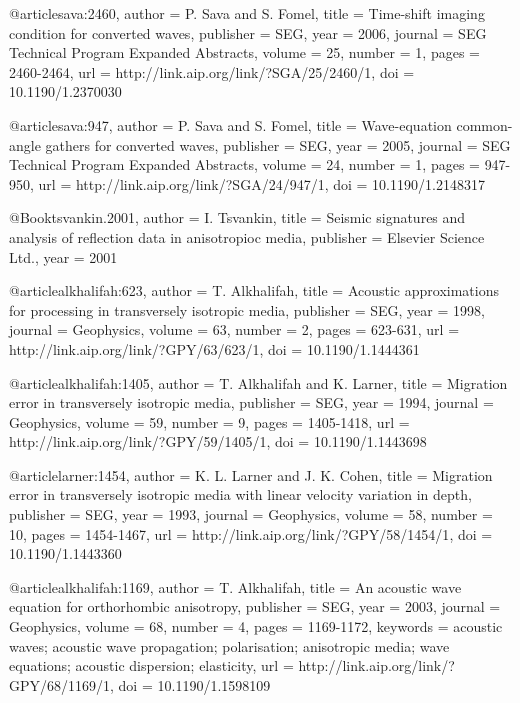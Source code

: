 @article{sava:2460,
  author =	 {P. Sava and S. Fomel},
  title =	 {Time-shift imaging condition for converted waves},
  publisher =	 {SEG},
  year =	 2006,
  journal =	 {SEG Technical Program Expanded Abstracts},
  volume =	 25,
  number =	 1,
  pages =	 {2460-2464},
  url =		 {http://link.aip.org/link/?SGA/25/2460/1},
  doi =		 {10.1190/1.2370030}
}

@article{sava:947,
  author =	 {P. Sava and S. Fomel},
  title =	 {Wave-equation common-angle gathers for converted
                  waves},
  publisher =	 {SEG},
  year =	 2005,
  journal =	 {SEG Technical Program Expanded Abstracts},
  volume =	 24,
  number =	 1,
  pages =	 {947-950},
  url =		 {http://link.aip.org/link/?SGA/24/947/1},
  doi =		 {10.1190/1.2148317}
}

@Book{tsvankin.2001,
  author =	 {I. Tsvankin},
  title =	 {Seismic signatures and analysis of reflection data
                  in anisotropioc media},
  publisher =	 {Elsevier Science Ltd.},
  year =	 2001
}

@article{alkhalifah:623,
  author =	 {T. Alkhalifah},
  title =	 {Acoustic approximations for processing in
                  transversely isotropic media},
  publisher =	 {SEG},
  year =	 1998,
  journal =	 {Geophysics},
  volume =	 63,
  number =	 2,
  pages =	 {623-631},
  url =		 {http://link.aip.org/link/?GPY/63/623/1},
  doi =		 {10.1190/1.1444361}
}

@article{alkhalifah:1405,
  author =	 {T. Alkhalifah and K. Larner},
  title =	 {Migration error in transversely isotropic media},
  publisher =	 {SEG},
  year =	 1994,
  journal =	 {Geophysics},
  volume =	 59,
  number =	 9,
  pages =	 {1405-1418},
  url =		 {http://link.aip.org/link/?GPY/59/1405/1},
  doi =		 {10.1190/1.1443698}
}

@article{larner:1454,
  author =	 {K. L. Larner and J. K. Cohen},
  title =	 {Migration error in transversely isotropic media with
                  linear velocity variation in depth},
  publisher =	 {SEG},
  year =	 1993,
  journal =	 {Geophysics},
  volume =	 58,
  number =	 10,
  pages =	 {1454-1467},
  url =		 {http://link.aip.org/link/?GPY/58/1454/1},
  doi =		 {10.1190/1.1443360}
}

@article{alkhalifah:1169,
  author =	 {T. Alkhalifah},
  title =	 {An acoustic wave equation for orthorhombic
                  anisotropy},
  publisher =	 {SEG},
  year =	 2003,
  journal =	 {Geophysics},
  volume =	 68,
  number =	 4,
  pages =	 {1169-1172},
  keywords =	 {acoustic waves; acoustic wave propagation;
                  polarisation; anisotropic media; wave equations;
                  acoustic dispersion; elasticity},
  url =		 {http://link.aip.org/link/?GPY/68/1169/1},
  doi =		 {10.1190/1.1598109}
}

